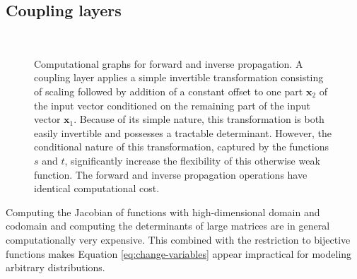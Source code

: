 \documentclass{article}
\newcommand{\mb}{\mathbf}
\begin{document}
\subsection{Coupling layers}
\begin{figure}
    \centering
     ~~~~~~
    \caption{Computational graphs for forward and inverse propagation. A coupling layer applies a simple invertible transformation consisting of scaling followed by addition of a constant offset to one part $\mb x_{2}$ of the input vector conditioned on the remaining part of the input vector $\mb x_{1}$. Because of its simple nature, this transformation is both easily invertible and possesses a tractable determinant.
    However, the conditional nature of this transformation, captured by the functions $s$ and $t$, significantly increase the flexibility of this otherwise weak function.
	The forward and inverse propagation operations have identical computational cost. }
\end{figure}


Computing the Jacobian of functions with high-dimensional domain and codomain and computing the determinants of large matrices are in general computationally very expensive. This combined with the restriction to bijective functions makes Equation \ref{eq:change-variables} appear impractical for modeling arbitrary distributions.
\end{document}
